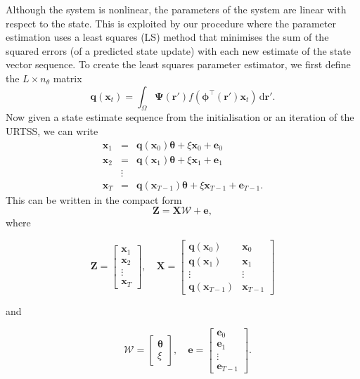 \documentclass[12pt]{iopart}
\begin{document}
Although the system is nonlinear, the parameters of the system are linear with respect to the state. This is exploited by our procedure where the parameter estimation uses a least squares (LS) method that minimises the sum of the squared errors (of a predicted state update) with each new estimate of the state vector sequence. To create the least squares parameter estimator, we first define the $L \times n_{\theta}$ matrix
\begin{equation}
	\mathbf{q}(\mathbf{x}_t) = \int_\Omega \boldsymbol{\Psi}(\mathbf{r}') f(\boldsymbol{\phi}^{\top}(\mathbf{r}')\mathbf{x}_t) \,\textrm{d}\mathbf{r}'.
\end{equation}
Now given a state estimate sequence from the initialisation or an iteration of the URTSS, we can write
\begin{eqnarray*}
	\mathbf x_{1} &=& \mathbf{q}(\mathbf x_0) \boldsymbol{\theta}+\xi\mathbf x_0+\mathbf e_0 \\
	\mathbf x_{2} &=& \mathbf{q}(\mathbf x_1) \boldsymbol{\theta}+\xi\mathbf x_1+\mathbf e_1  \\
	&\vdots& \\
	\mathbf x_{T}&=& \mathbf{q}(\mathbf x_{T-1}) \boldsymbol{\theta}+\xi\mathbf x_{T-1}+\mathbf e_{T-1}. 
\end{eqnarray*}
This can be written in the compact form
\begin{equation}
	\mathbf Z=\mathbf X \mathcal W+\mathbf{e}, 
\end{equation}
where
\begin{small}
\begin{equation*}
	\mathbf Z=\left[
	\begin{array}{cccc}
		\mathbf x_{1}\\
		\mathbf x_{2}\\
		\vdots\\
		\mathbf x_{T}
	\end{array}
	\right],\quad \mathbf X=\left[
	\begin{array}{cccc}
		\mathbf q(\mathbf x_0)& \mathbf x_{0}\\
		\mathbf q(\mathbf x_1)& \mathbf x_{1}\\
		\vdots & \vdots\\
		\mathbf q(\mathbf x_{T-1})& \mathbf x_{T-1}
	\end{array}
	\right] 
\end{equation*}
\end{small}
and
\begin{small}
\begin{equation*}
\quad \mathcal W=\left[
	\begin{array}{cc}
		\boldsymbol{\theta} \\
		\xi
	\end{array}
	\right],\quad \mathbf{e}=\left[
	\begin{array}{cccc}
		\mathbf e_0\\
		\mathbf e_1\\
		\vdots\\
		\mathbf e_{T-1}
	\end{array}
	\right].
\end{equation*}
\end{small}
\end{document}
